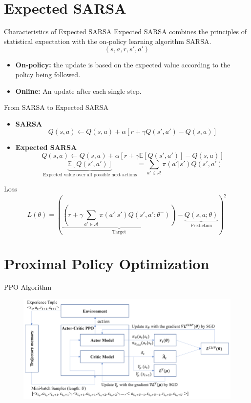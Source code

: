 \documentclass[serif]{beamer}  %
\begin{document}
\section{Expected SARSA}

\begin{frame}{Characteristics of Expected SARSA}
    Expected SARSA combines the principles of statistical expectation with the on-policy learning algorithm SARSA.
    $$(s, a, r, s', a')$$
    \begin{itemize}
        \item \textbf{On-policy:} the update is based on the expected value according to the policy being followed.
        \vspace{0.5cm}
        \item \textbf{Online:} An update after each single step.
    \end{itemize}
\end{frame}

\begin{frame}{From SARSA to Expected SARSA}
    \begin{itemize}
        \item \textbf{SARSA}
        $$Q(s, a) \leftarrow Q(s, a) + \alpha \left[ r + \gamma Q(s', a') - Q(s, a) \right]$$
        \item \textbf{Expected SARSA}
        $$Q(s, a) \leftarrow Q(s, a) + \alpha \left[ r + \gamma \mathbb{E}[Q(s', a')] - Q(s, a) \right]$$
        $$\underbrace{\mathbb{E}[Q(s', a')]}_{\text{Expected value over all possible next actions}} = \sum_{a' \in \mathcal{A}} \pi(a'|s') Q(s', a')$$
    \end{itemize}
\end{frame}

\begin{frame}{Loss}
$$L(\theta) = \left( \underbrace{\left( r + \gamma \sum_{a' \in \mathcal{A}} \pi(a'|s') Q(s', a'; \theta^-) \right)}_{\text{Target}} - \underbrace{Q(s, a; \theta)}_{\text{Prediction}} \right)^2$$
\end{frame}


\section{Proximal Policy Optimization}

\begin{frame}{PPO Algorithm}
    \begin{figure}
        \centering
        \includegraphics[width=\linewidth]{images/PPO_diagram.png}
    \end{figure}
\end{frame}
\end{document}
